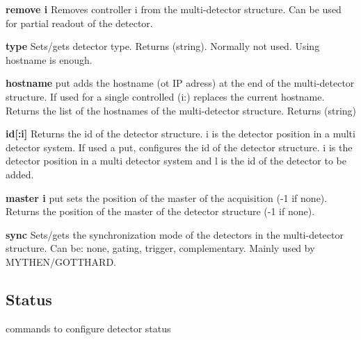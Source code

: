 \begin{DoxyItemize}
\item {\bfseries remove i} Removes controller {\ttfamily i} from the multi-\/detector structure. Can be used for partial readout of the detector.
\end{DoxyItemize}


\begin{DoxyItemize}
\item {\bfseries type} Sets/gets detector type. {\ttfamily Returns} {\ttfamily }(string). Normally not used. Using hostname is enough.
\end{DoxyItemize}


\begin{DoxyItemize}
\item {\bfseries hostname} {\ttfamily put} adds the hostname (ot IP adress) at the end of the multi-\/detector structure. If used for a single controlled (i:) replaces the current hostname. Returns the list of the hostnames of the multi-\/detector structure. {\ttfamily Returns} {\ttfamily }(string)
\end{DoxyItemize}


\begin{DoxyItemize}
\item {\bfseries id\mbox{[}:i\mbox{]}} Returns the id of the detector structure. i is the detector position in a multi detector system. If used a {\ttfamily put}, configures the id of the detector structure. i is the detector position in a multi detector system and l is the id of the detector to be added.
\end{DoxyItemize}


\begin{DoxyItemize}
\item {\bfseries master i} {\ttfamily put} sets the position of the master of the acquisition (-\/1 if none). Returns the position of the master of the detector structure (-\/1 if none).
\end{DoxyItemize}


\begin{DoxyItemize}
\item {\bfseries sync} Sets/gets the synchronization mode of the detectors in the multi-\/detector structure. Can be: {\ttfamily none}, {\ttfamily gating}, {\ttfamily trigger}, {\ttfamily complementary}. Mainly used by MYTHEN/GOTTHARD.
\end{DoxyItemize}\hypertarget{config_configstatus}{}\subsection{Status}\label{config_configstatus}
commands to configure detector status


